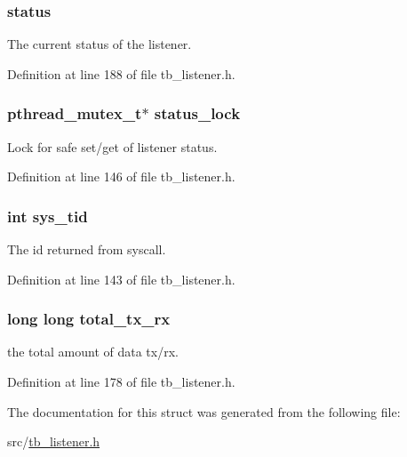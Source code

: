 \hypertarget{structtb__listener__t_a1025e6cbbd3179d2d91b9b4afb8f8efc}{
\subsubsection[{status}]{ status}}\label{structtb__listener__t_a1025e6cbbd3179d2d91b9b4afb8f8efc}


The current status of the listener. 



Definition at line 188 of file tb\-\_\-listener.\-h.

\hypertarget{structtb__listener__t_a54cc7a2ff1d7592de7c4647c6fd66e14}{
\subsubsection[{status\-\_\-lock}]{\setlength{\rightskip}{0pt plus 5cm}pthread\-\_\-mutex\-\_\-t$\ast$ status\-\_\-lock}}\label{structtb__listener__t_a54cc7a2ff1d7592de7c4647c6fd66e14}


Lock for safe set/get of listener status. 



Definition at line 146 of file tb\-\_\-listener.\-h.

\hypertarget{structtb__listener__t_a053be2f9198a10c7329b11c19dfc6fe4}{
\subsubsection[{sys\-\_\-tid}]{\setlength{\rightskip}{0pt plus 5cm}int sys\-\_\-tid}}\label{structtb__listener__t_a053be2f9198a10c7329b11c19dfc6fe4}


The id returned from syscall. 



Definition at line 143 of file tb\-\_\-listener.\-h.

\hypertarget{structtb__listener__t_af6b56edb73bc2df2c5b45cb794532ce5}{
\subsubsection[{total\-\_\-tx\-\_\-rx}]{\setlength{\rightskip}{0pt plus 5cm}long long total\-\_\-tx\-\_\-rx}}\label{structtb__listener__t_af6b56edb73bc2df2c5b45cb794532ce5}


the total amount of data tx/rx. 



Definition at line 178 of file tb\-\_\-listener.\-h.



The documentation for this struct was generated from the following file\-:\begin{DoxyCompactItemize}
\item 
src/\hyperlink{tb__listener_8h}{tb\-\_\-listener.\-h}\end{DoxyCompactItemize}
